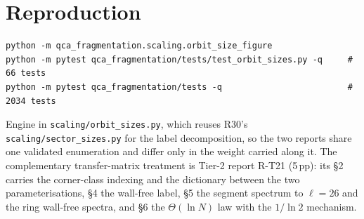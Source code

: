 \documentclass[11pt]{article}
\newcommand{\fn}[1]{\texttt{#1}}
\theoremstyle{plain}
\theoremstyle{remark}
\begin{document}
\section{Reproduction}

\begin{verbatim}
python -m qca_fragmentation.scaling.orbit_size_figure
python -m pytest qca_fragmentation/tests/test_orbit_sizes.py -q     # 66 tests
python -m pytest qca_fragmentation/tests -q                         # 2034 tests
\end{verbatim}

\noindent Engine in \fn{scaling/orbit\_sizes.py}, which reuses R30's
\fn{scaling/sector\_sizes.py} for the label decomposition, so the two reports
share one validated enumeration and differ only in the weight carried along it.
The complementary transfer-matrix treatment is Tier-2 report R-T21 (5\,pp):
its \S2 carries the corner-class indexing and the dictionary between the two
parameterisations, \S4 the wall-free label, \S5 the segment spectrum to
$\ell=26$ and the ring wall-free spectra, and \S6 the $\Theta(\ln N)$ law with
the $1/\ln2$ mechanism.
\end{document}
